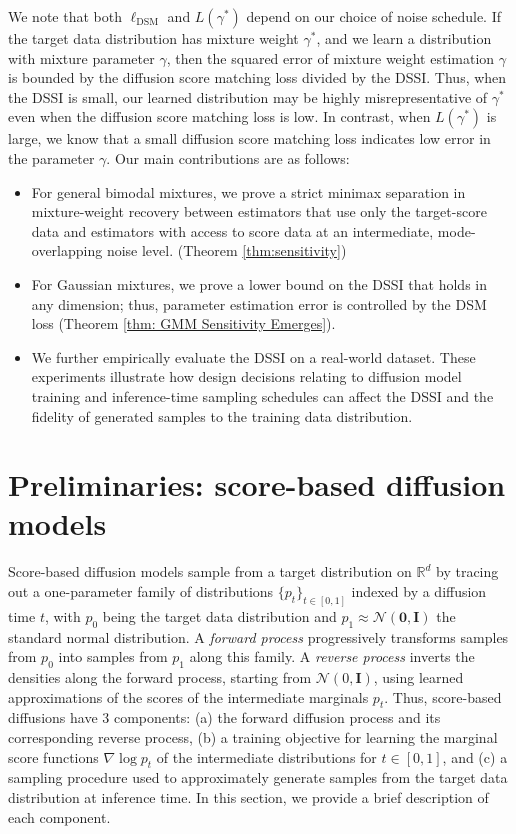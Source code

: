 \documentclass[11pt]{article}
\theoremstyle{plain}
\newcommand{\1}{\mathbbm{1}}
\newcommand{\ldsm}{\ell_\mathrm{DSM}}
\begin{document}
We note that both $\ldsm$ and $L(\gamma^*)$ depend on our choice of noise schedule.
If the target data distribution has mixture weight $\gamma^*$, and we learn a distribution with mixture parameter $\gamma$, then the squared error of mixture weight estimation $\gamma$ is bounded by the diffusion score matching loss divided by the DSSI. Thus, when the DSSI is small, our learned distribution may be highly misrepresentative of $\gamma^*$ even when the diffusion score matching loss is low. In contrast, when $L(\gamma^*)$ is large, we know that a small diffusion score matching loss indicates low error in the parameter $\gamma$. Our main contributions are as follows:
\begin{itemize}
    \item For general bimodal mixtures, we prove a strict minimax separation in mixture-weight recovery between estimators that use only the target-score data and estimators with access to score data at an intermediate, mode-overlapping noise level. (Theorem \ref{thm:sensitivity})
    \item For Gaussian mixtures, we prove a lower bound on the DSSI that holds in any dimension; thus, parameter estimation error is controlled by the DSM loss (Theorem \ref{thm: GMM Sensitivity Emerges}).
    
    \item We further empirically evaluate the DSSI on a real-world dataset. These experiments illustrate how design decisions relating to diffusion model training and inference-time sampling schedules can affect the DSSI and the fidelity of generated samples to the training data distribution.
\end{itemize}
\section{Preliminaries: score-based diffusion models}
\label{sec:prelim}
Score-based diffusion models sample from a target distribution on $\mathbb{R}^d$ by tracing out a one-parameter family of distributions $\{p_t\}_{t \in [0,1]}$ indexed by a diffusion time $t$, with $p_0$ being the target data distribution and $p_1 \approx \mathcal{N}(\mathbf{0}, \mathbf{I})$ the standard normal distribution. A \emph{forward process} progressively transforms samples from $p_0$ into samples from $p_1$ along this family. A \emph{reverse process} inverts the densities along the forward process, starting from $\mathcal{N}(0,\mathbf{I})$, using learned approximations of the scores of the intermediate marginals $p_t$.
Thus, score-based diffusions have 3 components: (a) the forward diffusion process and its corresponding reverse process, (b) a training objective for learning the marginal score functions $\nabla \log p_t$ of the intermediate distributions for $t\in [0,1]$,  and (c) a sampling procedure used to approximately generate samples from the target data distribution at inference time. In this section, we provide a brief description of each component.
\end{document}
